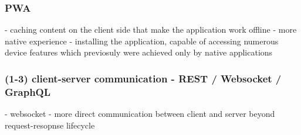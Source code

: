 \subsubsection*{PWA}

- caching content on the client side that make the application work offline
- more native experience - installing the application, capable of accessing numerous device features which previosuly were achieved only by native applications

\subsubsection*{(1-3) client-server communication - REST / Websocket / GraphQL}

- websocket - more direct communication between client and server beyond request-resopnse lifecycle




